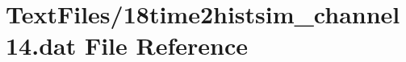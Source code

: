\hypertarget{18time2histsim__channel14_8dat}{}\section{Text\+Files/18time2histsim\+\_\+channel14.dat File Reference}
\label{18time2histsim__channel14_8dat}
